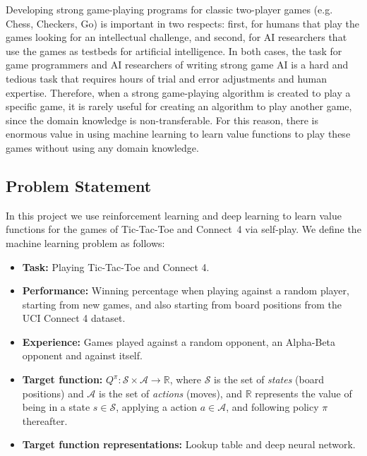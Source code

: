 \documentclass{article}
\begin{document}
Developing strong game-playing programs for classic two-player games (e.g. Chess, Checkers, Go) is
important in two respects: first, for humans that play the games looking for an intellectual
challenge, and second, for AI researchers that use the games as testbeds for artificial
intelligence. In both cases, the task for game programmers and AI researchers of writing strong game
AI is a hard and tedious task that requires hours of trial and error adjustments and human
expertise. Therefore, when a strong game-playing algorithm is created to play a specific game, it is
rarely useful for creating an algorithm to play another game, since the domain knowledge is
non-transferable. For this reason, there is enormous value in using machine learning to learn value
functions to play these games without using any domain knowledge.

\subsection{Problem Statement}
\label{sec:problem-statement}

\newcommand{\URLcf}{https://en.wikipedia.org/wiki/Connect_Four}

In this project we use reinforcement learning and deep learning to learn value functions for the
games of \mbox{Tic-Tac-Toe} and \mbox{Connect 4} via self-play. We define the machine learning
problem as follows:

\begin{itemize}

    \item \textbf{Task:} Playing Tic-Tac-Toe and Connect 4.

    \item \textbf{Performance:} Winning percentage when playing against a random player, starting
        from new games, and also starting from board positions from the UCI Connect 4 dataset.

    \item \textbf{Experience:} Games played against a random opponent, an Alpha-Beta opponent and
        against itself.

    \item \textbf{Target function:} $Q^\pi : \mathcal{S} \times \mathcal{A} \to \mathbb{R}$, where
        $\mathcal{S}$ is the set of \emph{states} (board positions) and $\mathcal{A}$ is the set of
        \emph{actions} (moves), and $\mathbb{R}$ represents the value of being in a state $s \in
        \mathcal{S}$, applying a action $a \in \mathcal{A}$, and following policy $\pi$ thereafter.

    \item \textbf{Target function representations:} Lookup table and deep neural network.

\end{itemize}
\end{document}
